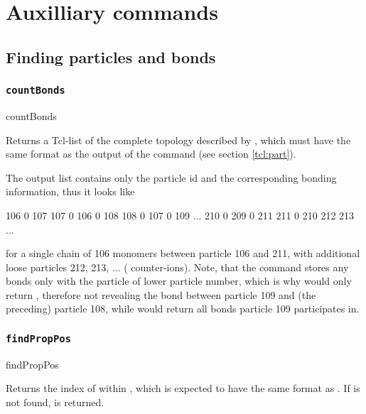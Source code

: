 \chapter{Auxilliary commands}
\label{chap:aux}


\section{Finding particles and bonds}


\subsection{\texttt{countBonds}}
\begin{essyntax}
  countBonds 
\end{essyntax}
Returns a Tcl-list of the complete topology described by
, which must have the same format as the output of
the command  (see section \vref{tcl:part}).

The output list contains only the particle id and the corresponding
bonding information, thus it looks like \eg{}
\begin{tclcode}
{106 {0 107}} {107 {0 106} {0 108}} {108 {0 107} {0 109}} ...
{210 {0 209} {0 211}} {211 {0 210}} 212 213 ... 
\end{tclcode}
for a single chain of 106 monomers between particle 106 and 211, with
additional loose particles 212, 213, ... (\eg{} counter-ions).  Note,
that the  command stores any bonds only with the particle of
lower particle number, which is why \codebox{[part 109]} would only
return , therefore not revealing the
bond between particle 109 and (the preceding) particle 108, while
 would return all bonds particle 109 participates in.

\subsection{\texttt{findPropPos}}
\begin{essyntax}
  findPropPos  
\end{essyntax}
Returns the index of  within
, which is expected to have the same
format as . If  is not
found,  is returned.


